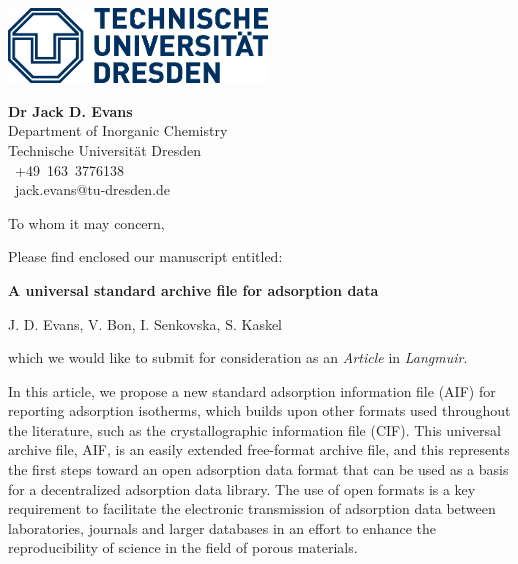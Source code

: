 \documentclass[11pt, a4paper]{letter} %
\begin{document}
\signature{Dr Jack D. Evans}           %
\longindentation=0pt                       %
\let\raggedleft\raggedright                %


\begin{letter}{ }
\noindent
\begin{minipage}[t]{.6\textwidth}
~\par\vspace{-\baselineskip}
\includegraphics[height=2cm]{TU_Dresden_Logo_HKS41.eps}
\vfill
\end{minipage}%
\begin{minipage}[t]{.4\textwidth}
{\large\bf Dr Jack D. Evans}\smallskip\\
Department of Inorganic Chemistry \\
Technische Universität Dresden \\
\faMobile~+49~163~3776138 \\
\Letter~jack.evans@tu-dresden.de
\end{minipage}%
\bigskip{\color{blues}\hrule}
\vfill %


\opening{To whom it may concern,}

Please find enclosed our manuscript entitled:

\smallskip
\begin{center}
\noindent \textbf{A universal standard archive file for adsorption data}

\noindent J. D. Evans, V. Bon, I. Senkovska, S. Kaskel
\end{center}
\smallskip

\noindent which we would like to submit for consideration as an \textit{Article} in \textit{Langmuir}.

In this article, we propose a new standard adsorption information file (AIF) for reporting adsorption isotherms, which builds upon other formats used throughout the literature, such as the crystallographic information file (CIF).
This universal archive file, AIF, is an easily extended free-format archive file, and this represents the first steps toward an open adsorption data format that can be used as a basis for a decentralized adsorption data library.
The use of open formats is a key requirement to facilitate the electronic transmission of adsorption data between laboratories, journals and larger databases in an effort to enhance the reproducibility of science in the field of porous materials.


\end{letter}
\end{document}

